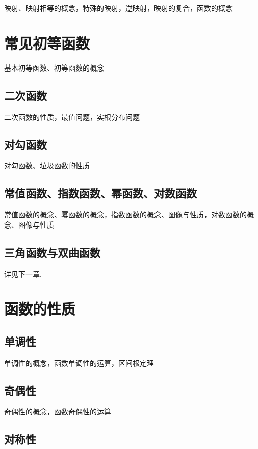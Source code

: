 \documentclass[lang=cn, zihao=4.5]{elegantbook}
\begin{document}
映射、映射相等的概念，特殊的映射，逆映射，映射的复合，函数的概念

\section{常见初等函数}

基本初等函数、初等函数的概念

\subsection{二次函数}

二次函数的性质，最值问题，实根分布问题

\subsection{对勾函数}

对勾函数、垃圾函数的性质

\subsection{常值函数、指数函数、幂函数、对数函数}

常值函数的概念、幂函数的概念，指数函数的概念、图像与性质，对数函数的概念、图像与性质

\subsection{三角函数与双曲函数}

详见下一章.

\section{函数的性质}

\subsection{单调性}

单调性的概念，函数单调性的运算，区间根定理

\subsection{奇偶性}

奇偶性的概念，函数奇偶性的运算

\subsection{对称性}
\end{document}
